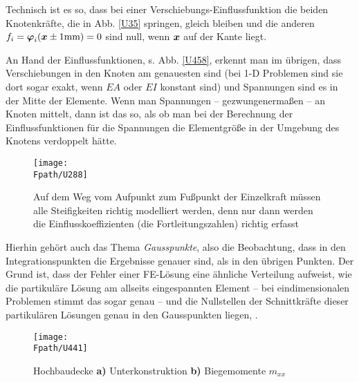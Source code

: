 Technisch ist es so, dass bei einer Verschiebungs-Einflussfunktion die beiden Knotenkr\"{a}fte, die in Abb. \ref{U35} springen, gleich bleiben und die anderen $f_i = \mbox{\boldmath $\varphi$}_i(\mbox{\boldmath $x$} \pm 1 \text{mm}) = 0$ sind null, wenn $\mbox{\boldmath $x$}$ auf der Kante liegt.

An Hand der Einflussfunktionen, s. Abb. \ref{U458}, erkennt man im \"{u}brigen, dass Verschiebungen  in den Knoten am genauesten sind (bei 1-D Problemen sind sie dort sogar exakt, wenn $EA$ oder $EI$ konstant sind) und Spannungen sind es in der Mitte der Elemente. Wenn man Spannungen -- gezwungenerma{\ss}en -- an Knoten mittelt, dann ist das so, als ob man bei der Berechnung der Einflussfunktionen f\"{u}r die Spannungen die Elementgr\"{o}{\ss}e in der Umgebung des Knotens verdoppelt h\"{a}tte.
\begin{figure}
\centering
\if {} \sidecaption \fi
\texttt{[image: \\Fpath/U288]}
\caption{Auf dem Weg vom Aufpunkt zum Fu{\ss}punkt der Einzelkraft m\"{u}ssen alle Steifig\-keiten richtig modelliert werden, denn nur dann werden die Einflusskoeffizienten (die Fortleitungszahlen) richtig erfasst}
\label{U288}%
\end{figure}%

Hierhin geh\"{o}rt auch das Thema {\em Gausspunkte\/}, also die Beobachtung, dass in den Integrationspunkten die Ergebnisse genauer sind, als in den \"{u}brigen Punkten. Der Grund ist, dass der Fehler einer FE-L\"{o}sung eine \"{a}hnliche Verteilung aufweist, wie die partikul\"{a}re L\"{o}sung am allseits eingespannten Element -- bei eindimensionalen Problemen stimmt das sogar genau -- und die Nullstellen der Schnittkr\"{a}fte dieser partikul\"{a}ren L\"{o}sungen genau in den Gausspunkten liegen, \cite{Ha6}.
\begin{figure}[tbp]
\centering
\if {} \sidecaption[t] \fi
\texttt{[image: \\Fpath/U441]}
\caption{Hochbaudecke \textbf{ a)} Unterkonstruktion \textbf{ b)} Biegemomente $m_{xx}$} \label{U441}
\end{figure}%


